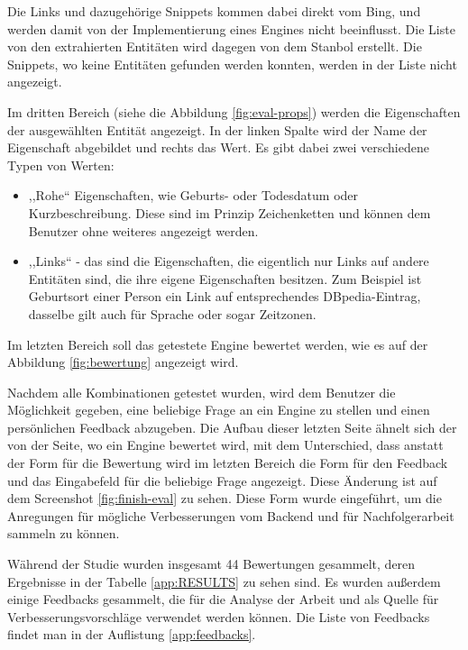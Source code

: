 Die Links und dazugehörige Snippets kommen dabei direkt vom Bing, und werden damit von der Implementierung eines Engines nicht beeinflusst. Die Liste von den extrahierten Entitäten wird dagegen von dem Stanbol erstellt. Die Snippets, wo keine Entitäten gefunden werden konnten, werden in der Liste nicht angezeigt.

Im dritten Bereich (siehe die Abbildung \ref{fig:eval-props}) werden die Eigenschaften der ausgewählten Entität angezeigt. In der linken Spalte wird der Name der Eigenschaft abgebildet und rechts das Wert. Es gibt dabei zwei verschiedene Typen von Werten:
\begin{itemize}
\item ,,Rohe`` Eigenschaften, wie Geburts- oder Todesdatum oder Kurzbeschreibung. Diese sind im Prinzip Zeichenketten und können dem Benutzer ohne weiteres angezeigt werden.
\item ,,Links`` - das sind die Eigenschaften, die eigentlich nur Links auf andere Entitäten sind, die ihre eigene Eigenschaften besitzen. Zum Beispiel ist Geburtsort einer Person ein Link auf entsprechendes DBpedia-Eintrag, dasselbe gilt auch für Sprache oder sogar Zeitzonen.
\end{itemize}

Im letzten Bereich soll das getestete Engine bewertet werden, wie es auf der Abbildung \ref{fig:bewertung} angezeigt wird.

Nachdem alle Kombinationen getestet wurden, wird dem Benutzer die Möglichkeit gegeben, eine beliebige Frage an ein Engine zu stellen und einen persönlichen Feedback abzugeben. Die Aufbau dieser letzten Seite ähnelt sich der von der Seite, wo ein Engine bewertet wird, mit dem Unterschied, dass anstatt der Form für die Bewertung wird im letzten Bereich die Form für den Feedback und das Eingabefeld für die beliebige Frage angezeigt. Diese Änderung ist auf dem Screenshot \ref{fig:finish-eval} zu sehen. Diese Form wurde eingeführt, um die Anregungen für mögliche Verbesserungen vom Backend und für Nachfolgerarbeit sammeln zu können.

Während der Studie wurden insgesamt 44 Bewertungen gesammelt, deren Ergebnisse in der Tabelle \ref{app:RESULTS} zu sehen sind. Es wurden außerdem einige Feedbacks gesammelt, die für die Analyse der Arbeit und als Quelle für Verbesserungsvorschläge verwendet werden können. Die Liste von Feedbacks findet man in der Auflistung \ref{app:feedbacks}.

